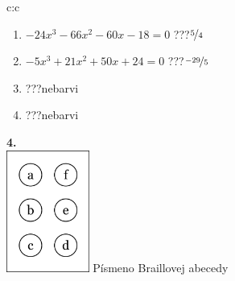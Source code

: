\documentclass[10pt]{report}
\begin{document}
\begin{tabular}{c:c}
\begin{minipage}[c][99mm][t]{0.49\linewidth}
\begin{center}
\begin{minipage}{0.77\linewidth}
\begin{center}
\begin{varwidth}{\textwidth}
\begin{enumerate}
\item $-24x^3-66x^2-60x-18=0$\quad \dotfill\; ???\;\dotfill \quad $\nicefrac{5}{4}$
\item $-5x^3+21x^2+50x+24=0$\quad \dotfill\; ???\;\dotfill \quad $\nicefrac{-29}{5}$
\item \quad \dotfill\; ???\;\dotfill \quad nebarvi
\item \quad \dotfill\; ???\;\dotfill \quad nebarvi
\end{enumerate}
\end{varwidth}
\end{center}
\end{minipage}
\begin{minipage}{0.20\linewidth}
\begin{center}
{\Huge\bfseries 4.} \\[2mm]
\includegraphics[height=40mm]{../images/braille.png}
{\small Písmeno Braillovej abecedy}
\end{center}
\end{minipage}
\end{center}
\end{minipage}

\end{tabular}
\clearpage
\thispagestyle{empty}
\end{document}
